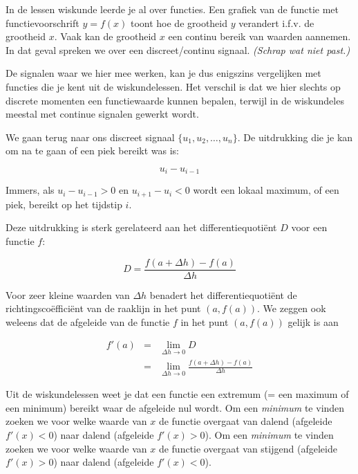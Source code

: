 \begin{oef}
	In de lessen wiskunde leerde je al over functies. Een grafiek van de functie met functievoorschrift $y=f(x)$ toont hoe de grootheid $y$ verandert i.f.v. de grootheid $x$. Vaak kan de grootheid $x$ een continu bereik van waarden aannemen. In dat geval spreken we over een discreet/continu signaal. \emph{(Schrap wat niet past.)}
\end{oef}

De signalen waar we hier mee werken, kan je dus enigszins vergelijken met functies die je kent uit de wiskundelessen. 
Het verschil is dat we hier slechts op discrete momenten een functiewaarde kunnen bepalen, terwijl in de wiskundeles meestal met continue signalen gewerkt wordt.

We gaan terug naar ons discreet signaal $\{ u_1, u_2, \ldots, u_n\}$. De uitdrukking die je kan om na te gaan of een piek bereikt was is:

\begin{equation*}
u_i-u_{i-1}
\end{equation*}

Immers, als $u_{i}-u_{i-1}>0$ en $u_{i+1}-u_{i}<0$ wordt een lokaal maximum, of een piek, bereikt op het tijdstip $i$.

Deze uitdrukking is sterk gerelateerd aan het differentiequoti\"ent $D$ voor een functie $f$:

\begin{equation}
D = \frac{f(a+\Delta h) - f(a)}{\Delta h}
\end{equation}

Voor zeer kleine waarden van $\Delta h$ benadert het differentiequoti\"ent de richtingsco\"effici\"ent van de raaklijn in het punt $(a,f(a))$. We zeggen ook weleens dat de afgeleide van de functie $f$ in het punt $(a,f(a))$ gelijk is aan 

\begin{eqnarray*}
f'(a) &=& \lim\limits_{\Delta h \to 0} D \\
&=& \lim\limits_{\Delta h \to 0} \frac{f(a+\Delta h)-f(a)}{\Delta h}
\end{eqnarray*}

Uit de wiskundelessen weet je dat een functie een extremum (= een maximum of een minimum) bereikt waar de afgeleide nul wordt. Om een \emph{minimum} te vinden zoeken we voor welke waarde van $x$ de functie overgaat van dalend (afgeleide $f'(x)< 0$) naar dalend (afgeleide $f'(x)> 0$). Om een \emph{minimum} te vinden zoeken we voor welke waarde van $x$ de functie overgaat van stijgend (afgeleide $f'(x)>0$) naar dalend (afgeleide $f'(x)<0$).

